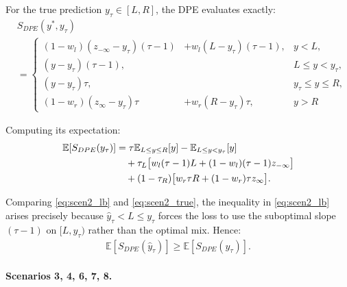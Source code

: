 \documentclass[sigconf]{acmart}
\begin{document}
For the true prediction $y_\tau \in [L,R]$, the DPE evaluates exactly:
\begin{align*}
&S_{DPE}(y^*, y_\tau) \\
& = \left\{
\begin{aligned}
(1-w_l)(z_{-\infty}-y_\tau)(\tau-1) &+ w_l(L-y_\tau)(\tau-1), & y < L, \\
(y-y_\tau)(\tau-1), & & L \le y < y_\tau, \\
(y-y_\tau)\tau, & & y_\tau \le y \le R, \\
(1-w_r)(z_{\infty}-y_\tau)\tau &+ w_r(R-y_\tau)\tau, & y > R
\end{aligned}
\right.
\end{align*}

Computing its expectation:
\begin{align}
\mathbb{E}[S_{DPE}(y_\tau)] &= \tau\mathbb{E}_{L\le y\le R}[y] - \mathbb{E}_{L\le y<y_\tau}[y] \notag\\
&\quad + \tau_L\bigl[w_l(\tau-1)L + (1-w_l)(\tau-1)z_{-\infty}\bigr] \notag\\
&\quad + (1-\tau_R)\bigl[w_r\tau R + (1-w_r)\tau z_{\infty}\bigr]. \label{eq:scen2_true}
\end{align}

Comparing \eqref{eq:scen2_lb} and \eqref{eq:scen2_true}, the inequality in \eqref{eq:scen2_lb} arises precisely because $\hat{y}_\tau < L \le y_\tau$ forces the loss to use the suboptimal slope $(\tau-1)$ on $[L, y_\tau)$ rather than the optimal mix. Hence:
\begin{align*}
\mathbb{E}[S_{DPE}(\hat{y}_\tau)] \ge \mathbb{E}[S_{DPE}(y_\tau)].
\end{align*}

\paragraph{Scenarios 3, 4, 6, 7, 8.}
\end{document}
